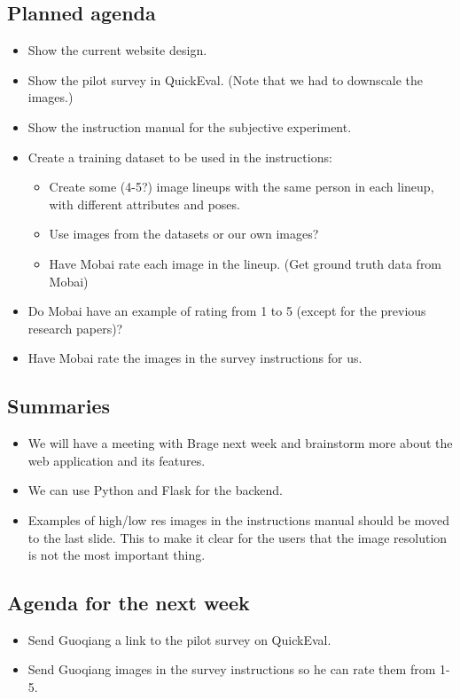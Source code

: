 \subsection*{Planned agenda}
\begin{itemize}
    \item Show the current website design.
    \item Show the pilot survey in QuickEval. (Note that we had to downscale the images.)
    \item Show the instruction manual for the subjective experiment.
    \item Create a training dataset to be used in the instructions:
    \begin{itemize}
        \item Create some (4-5?) image lineups with the same person in each lineup, with different attributes and poses.
        \item Use images  from the datasets or our own images?
        \item Have Mobai rate each image in the lineup. (Get ground truth data from Mobai)
    \end{itemize}
    \item Do Mobai have an example of rating from 1 to 5 (except for the previous research papers)?
    \item Have Mobai rate the images in the survey instructions for us.
\end{itemize}

\subsection*{Summaries}
\begin{itemize}
    \item We will have a meeting with Brage next week and brainstorm more about the web application and its features.
    \item We can use Python and Flask for the backend.
    \item Examples of high/low res images in the instructions manual should be moved to the last slide. This to make it clear for the users that the image resolution is not the most important thing.
\end{itemize}

\subsection*{Agenda for the next week}
\begin{itemize}
    \item Send Guoqiang a link to the pilot survey on QuickEval.
    \item Send Guoqiang images in the survey instructions so he can rate them from 1-5.
\end{itemize}


